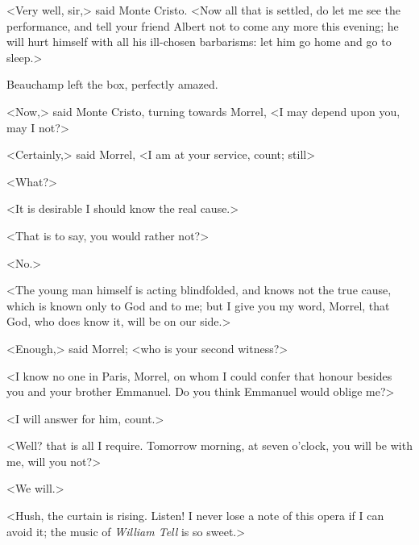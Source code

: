  <Very well, sir,> said Monte Cristo. <Now all that is settled, do let me see the performance, and tell your friend Albert not to come any more this evening; he will hurt himself with all his ill-chosen barbarisms: let him go home and go to sleep.> 

 Beauchamp left the box, perfectly amazed. 

 <Now,> said Monte Cristo, turning towards Morrel, <I may depend upon you, may I not?> 

 <Certainly,> said Morrel, <I am at your service, count; still\longdash> 

 <What?> 

 <It is desirable I should know the real cause.> 

 <That is to say, you would rather not?> 

 <No.> 

 <The young man himself is acting blindfolded, and knows not the true cause, which is known only to God and to me; but I give you my word, Morrel, that God, who does know it, will be on our side.> 

 <Enough,> said Morrel; <who is your second witness?> 

 <I know no one in Paris, Morrel, on whom I could confer that honour besides you and your brother Emmanuel. Do you think Emmanuel would oblige me?> 

 <I will answer for him, count.> 

 <Well? that is all I require. Tomorrow morning, at seven o'clock, you will be with me, will you not?> 

 <We will.> 

 <Hush, the curtain is rising. Listen! I never lose a note of this opera if I can avoid it; the music of \textit{William Tell} is so sweet.> 